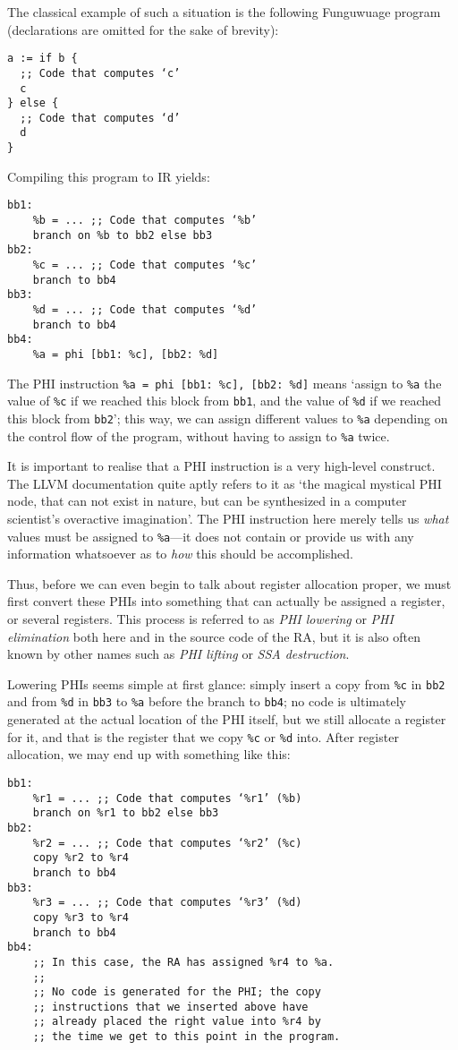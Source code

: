 \documentclass[12pt]{report}
\newcommand{\langname}{Funguwuage}
\begin{document}
The classical example of such a situation is the following \langname{} program (declarations are omitted for the sake of brevity):
\begin{Verbatim}
a := if b { 
  ;; Code that computes ‘c’
  c
} else {
  ;; Code that computes ‘d’
  d
}
\end{Verbatim}

\noindent Compiling this program to IR yields:
\begin{Verbatim}
bb1:
    %b = ... ;; Code that computes ‘%b’
    branch on %b to bb2 else bb3
bb2:
    %c = ... ;; Code that computes ‘%c’
    branch to bb4
bb3:
    %d = ... ;; Code that computes ‘%d’
    branch to bb4
bb4:
    %a = phi [bb1: %c], [bb2: %d]
\end{Verbatim}

\noindent The PHI instruction \verb|%a = phi [bb1: %c], [bb2: %d]| means ‘assign to \verb|%a| the value of \verb|%c| if we reached this block
from \verb|bb1|, and the value of \verb|%d| if we reached this block from \verb|bb2|’; this way, we can assign different values to \verb|%a|
depending on the control flow of the program, without having to assign to \verb|%a| twice.

It is important to realise that a PHI instruction is a very high-level construct. The LLVM documentation quite aptly refers to it as ‘the 
magical mystical PHI node, that can not exist in nature, but can be synthesized in a computer scientist's overactive imagination’. The PHI 
instruction here merely tells us \textit{what} values must be assigned to \verb|%a|—it does not contain or provide us with any information
whatsoever as to \textit{how} this should be accomplished.

Thus, before we can even begin to talk about register allocation proper, we must first convert these PHIs into something that can
actually be assigned a register, or several registers. This process is referred to as \textit{PHI lowering} or \textit{PHI elimination}
both here and in the source code of the RA, but it is also often known by other names such as \textit{PHI lifting} or \textit{SSA 
destruction}.

Lowering PHIs seems simple at first glance: simply insert a copy from \verb|%c| in \verb|bb2| and from \verb|%d| in \verb|bb3| to 
\verb|%a| before the branch to \verb|bb4|; no code is ultimately generated at the actual location of the PHI itself, but we
still allocate a register for it, and that is the register that we copy \verb|%c| or \verb|%d| into. After register allocation, we may 
end up with something like this:
\begin{Verbatim}
bb1:
    %r1 = ... ;; Code that computes ‘%r1’ (%b)
    branch on %r1 to bb2 else bb3
bb2:
    %r2 = ... ;; Code that computes ‘%r2’ (%c)
    copy %r2 to %r4
    branch to bb4
bb3:
    %r3 = ... ;; Code that computes ‘%r3’ (%d)
    copy %r3 to %r4
    branch to bb4
bb4:
    ;; In this case, the RA has assigned %r4 to %a.
    ;;
    ;; No code is generated for the PHI; the copy
    ;; instructions that we inserted above have
    ;; already placed the right value into %r4 by
    ;; the time we get to this point in the program.
\end{Verbatim}
\end{document}
